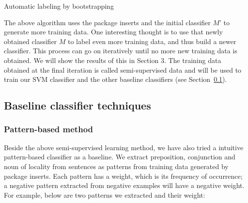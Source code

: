 \begin{algorithm}
	\caption{Automatic labeling by bootstrapping}
	\label{algo:bootstrap}
	\begin{algorithmic}[1]
		\Repeat
				\EndIf
			\EndFor
	\end{algorithmic}
\end{algorithm}


The above algorithm uses the package inserts and the initial classifier $M’$ to generate more training data. One interesting thought is to use that newly obtained classifier $M$ to label even more training data, and thus build a newer classifier. This process can go on iteratively until no more new training data is obtained. We will show the results of this in Section 3. The training data obtained at the final iteration is called semi-supervised data and will be used to train our SVM classifier and the other baseline classifiers (see Section~\ref{subsec:2.4}).

\subsection{Baseline classifier techniques}
\label{subsec:2.4}
\subsubsection{Pattern-based method}
\label{subsubsec:2.4.1}
Beside the above semi-supervised learning method, we have also tried a 
intuitive pattern-based classifier as a baseline. We extract preposition, 
conjunction and noun of locality from sentences as patterns from training data generated 
by package inserts. Each pattern has a weight, which is its frequency of occurrence; 
a negative pattern extracted from negative examples will have a negative weight. 
For example, below are two patterns we extracted and their weight:


